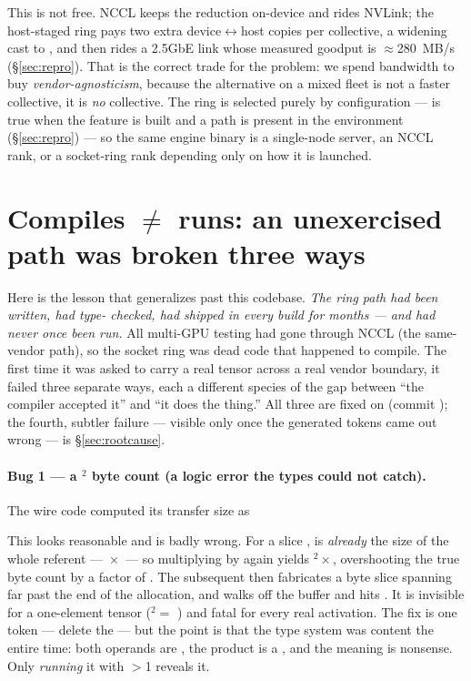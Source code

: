 \documentclass[11pt]{article}
\begin{document}
This is not free. NCCL keeps the reduction on-device and rides NVLink; the host-staged ring pays two
extra device$\leftrightarrow$host copies per collective, a widening cast to , and then rides a
2.5GbE link whose measured goodput is $\approx$280~MB/s (\S\ref{sec:repro}). That is the correct trade for
the problem: we spend bandwidth to buy \emph{vendor-agnosticism}, because the alternative on a mixed fleet
is not a faster collective, it is \emph{no} collective. The ring is selected purely by configuration ---
 is true when the  feature is built and a  path is present
in the environment (\S\ref{sec:repro}) --- so the same engine binary is a single-node server, an NCCL
rank, or a socket-ring rank depending only on how it is launched.

\section{Compiles $\ne$ runs: an unexercised path was broken three ways}
\label{sec:compiles}

Here is the lesson that generalizes past this codebase. \emph{The ring path had been written, had type-
checked, had shipped in every build for months --- and had never once been run.} All multi-GPU testing
had gone through NCCL (the same-vendor path), so the socket ring was dead code that happened to compile.
The first time it was asked to carry a real tensor across a real vendor boundary, it failed three
separate ways, each a different species of the gap between ``the compiler accepted it'' and ``it does the
thing.'' All three are fixed on  (commit ); the fourth, subtler failure ---
visible only once the generated tokens came out wrong --- is \S\ref{sec:rootcause}.

\paragraph{Bug 1 --- a $^2$ byte count (a logic error the types could not catch).}
The wire code computed its transfer size as
\begin{center}
\end{center}
This looks reasonable and is badly wrong. For a slice ,  is
\emph{already} the size of the whole referent --- \,$\times$\, --- so
multiplying by  again yields $^2$\,$\times$\,, overshooting the
true byte count by a factor of . The subsequent  then
fabricates a byte slice spanning far past the end of the allocation, and  walks off the
buffer and hits . It is invisible for a one-element tensor ($^2 =$ ) and
fatal for every real activation. The fix is one token --- delete the  --- but the point
is that the type system was content the entire time: both operands are , the product is a
, and the meaning is nonsense. Only \emph{running} it with $>$1 reveals it.
\end{document}
